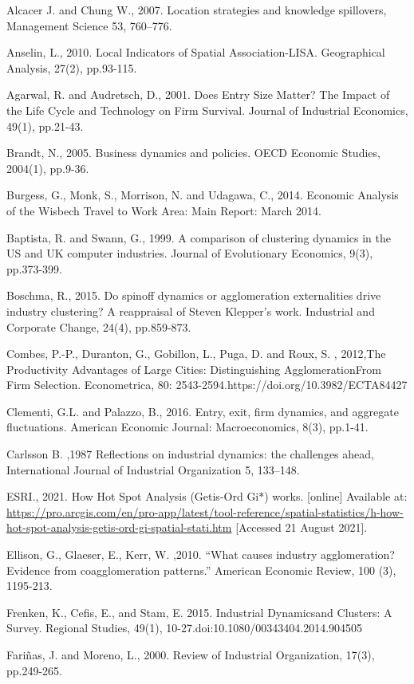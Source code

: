 \documentclass[
  12pt,
  oneside]{book}
\begin{document}
Alcacer J. and Chung W., 2007. Location strategies and knowledge spillovers, Management Science 53, 760--776.

Anselin, L., 2010. Local Indicators of Spatial Association-LISA. Geographical Analysis, 27(2), pp.93-115.

Agarwal, R. and Audretsch, D., 2001. Does Entry Size Matter? The Impact of the Life Cycle and Technology on Firm Survival. Journal of Industrial Economics, 49(1), pp.21-43.

Brandt, N., 2005. Business dynamics and policies. OECD Economic Studies, 2004(1), pp.9-36.

Burgess, G., Monk, S., Morrison, N. and Udagawa, C., 2014. Economic Analysis of the Wisbech Travel to Work Area: Main Report: March 2014.

Baptista, R. and Swann, G., 1999. A comparison of clustering dynamics in the US and UK computer industries. Journal of Evolutionary Economics, 9(3), pp.373-399.

Boschma, R., 2015. Do spinoff dynamics or agglomeration externalities drive industry clustering? A reappraisal of Steven Klepper's work. Industrial and Corporate Change, 24(4), pp.859-873.

Combes, P.-P., Duranton, G., Gobillon, L., Puga, D. and Roux, S. , 2012,The Productivity Advantages of Large Cities: Distinguishing AgglomerationFrom Firm Selection. Econometrica, 80: 2543-2594.https://doi.org/10.3982/ECTA84427

Clementi, G.L. and Palazzo, B., 2016. Entry, exit, firm dynamics, and aggregate fluctuations. American Economic Journal: Macroeconomics, 8(3), pp.1-41.

Carlsson B. ,1987 Reflections on industrial dynamics: the challenges ahead, International Journal of Industrial Organization 5,
133--148.

ESRI., 2021. How Hot Spot Analysis (Getis-Ord Gi*) works. {[}online{]} Available at: \url{https://pro.arcgis.com/en/pro-app/latest/tool-reference/spatial-statistics/h-how-hot-spot-analysis-getis-ord-gi-spatial-stati.htm} {[}Accessed 21 August 2021{]}.

Ellison, G., Glaeser, E., Kerr, W. ,2010. ``What causes industry agglomeration? Evidence from
coagglomeration patterns.'' American Economic Review, 100 (3), 1195-213.

Frenken, K., Cefis, E., and Stam, E. 2015. Industrial Dynamicsand Clusters: A Survey. Regional Studies, 49(1), 10-27.doi:10.1080/00343404.2014.904505

Fariñas, J. and Moreno, L., 2000. Review of Industrial Organization, 17(3), pp.249-265.
\end{document}
